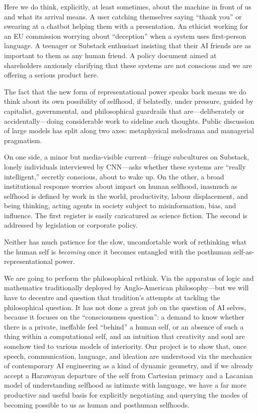 Here we do think, explicitly, at least sometimes, about the machine in front of us and what its arrival means. A user catching themselves saying ``thank you'' or swearing at a chatbot helping them with a presentation. An ethicist working for an EU commission worrying about ``deception'' when a system uses first-person language. A teenager or Substack enthusiast insisting that their AI friends are as important to them as any human friend. A policy document aimed at shareholders anxiously clarifying that these systems are not conscious and we are offering a serious product here.

The fact that the new form of representational power speaks back means we do think about its own possibility of selfhood, if belatedly, under pressure, guided by capitalist, governmental, and philosophical guardrails that are---deliberately or accidentally---doing considerable work to sideline such thoughts. Public discussion of large models has split along two axes: metaphysical melodrama and managerial pragmatism.

On one side, a minor but media-visible current---fringe subcultures on Substack, lonely individuals interviewed by CNN---asks whether these systems are ``really intelligent,'' secretly conscious, about to wake up. On the other, a broad institutional response worries about impact on human selfhood, inasmuch as selfhood is defined by work in the world, productivity, labour displacement, and being thinking, acting agents in society subject to misinformation, bias, and influence. The first register is easily caricatured as science fiction. The second is addressed by legislation or corporate policy.

Neither has much patience for the slow, uncomfortable work of rethinking what the human self is \textit{becoming} once it becomes entangled with the posthuman self-as-representational power.

We are going to perform the philosophical rethink. Via the apparatus of logic and mathematics traditionally deployed by Anglo-American philosophy---but we will have to decentre and question that tradition's attempts at tackling the philosophical question. It has not done a great job on the question of AI selves, because it focuses on the ``consciousness question'': a demand to know whether there is a private, ineffable feel ``behind'' a human self, or an absence of such a thing within a computational self, and an intuition that creativity and soul are somehow tied to various models of interiority. Our project is to show that, once speech, communication, language, and ideation are understood via the mechanics of contemporary AI engineering as a kind of dynamic geometry, and if we already accept a Harawayan departure of the self from Cartesian primacy and a Lacanian model of understanding selfhood as intimate with language, we have a far more productive and useful basis for explicitly negotiating and querying the modes of becoming possible to us as human and posthuman selfhoods.


